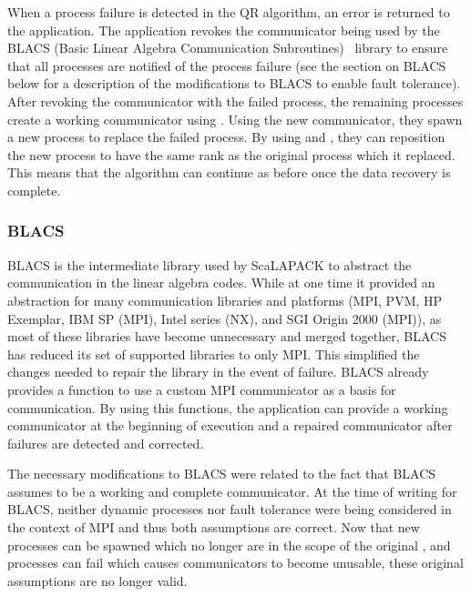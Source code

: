 When a process failure is detected in the QR algorithm, an error is returned 
to the application. The application revokes the communicator being used by the 
BLACS (Basic Linear Algebra Communication Subroutines)~\cite{Dongarra:1995uu}
library to ensure that all processes are notified of the process failure (see 
the section on BLACS below for a description of the modifications to
BLACS to enable fault tolerance). After revoking the communicator with the failed 
process, the remaining processes create a working communicator using 
. Using the new communicator, they spawn a new process 
to replace the failed process. By using  and 
, they can reposition the new process to have the same 
rank as the original process which it replaced. This means that the \abft 
algorithm can continue as before once the data recovery is complete.

\subsubsection{BLACS}
\label{subsubsect:ulfm:apps:qr:blacs}

BLACS is the intermediate library used by ScaLAPACK to abstract the communication in the linear algebra codes. While at one time it provided an abstraction for many 
communication libraries and platforms (MPI, PVM, HP Exemplar, IBM SP (MPI), Intel 
series (NX), and SGI Origin 2000 (MPI)), as most of these libraries have become 
unnecessary and merged together, BLACS has reduced its set of supported libraries 
to only MPI. This simplified the changes needed to repair the library in the event 
of failure. BLACS already provides a function to use a custom MPI communicator as 
a basis for communication. By using this functions, the application can provide a 
working communicator at the beginning of execution and a repaired communicator 
after failures are detected and corrected.

The necessary modifications to BLACS were related to the fact that BLACS assumes 
 to be a working and complete communicator. At the time of
writing for BLACS, neither dynamic processes nor fault tolerance were being considered
in the context of MPI and thus both assumptions are correct. Now that new processes can
be spawned which no longer are in the scope of the original ,
and processes can fail which causes communicators to become unusable, these original 
assumptions are no longer valid.

